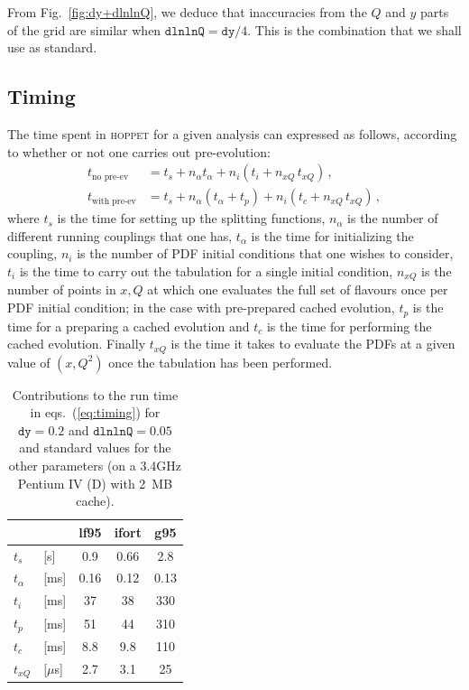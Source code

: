 \documentclass[12pt]{article}
\newcommand{\dy}{\ttt{dy}}
\newcommand{\dlnlnQ}{\ttt{dlnlnQ}}
\newcommand{\hoppet}{\textsc{hoppet}\xspace}
\newcommand{\ttt}[1]{\texttt{#1}}
\begin{document}
From Fig.~\ref{fig:dy+dlnlnQ}, we deduce that inaccuracies from the
$Q$ and $y$ parts of the grid are similar when $\dlnlnQ = \dy /4$.
This is the combination that we shall use as standard.


\subsection{Timing}
\label{sec:Timing}


The time spent in \hoppet for a given analysis can expressed as
follows, according to whether or not one carries out pre-evolution:
\begin{subequations}
  \label{eq:timing}
  \begin{align}
    t_\text{no pre-ev}   &= t_s + n_\alpha t_\alpha + n_i (t_i  + n_{xQ}\, t_{xQ})\,,\\
    t_\text{with pre-ev} &= t_s + n_\alpha (t_\alpha + t_p) + n_i (t_c + n_{xQ}\,
    t_{xQ})\,,
  \end{align}
\end{subequations}
where $t_s$ is the time for setting up the splitting functions,
$n_\alpha$ is the number of different running couplings that one has,
$t_\alpha$ is the time for initializing the coupling,
%
$n_i$ is the number of PDF initial conditions that one wishes to
consider, $t_i$ is the time to carry out the tabulation for a single
initial condition, $n_{xQ}$ is the number of points in $x,Q$ at which
one evaluates the full set of flavours once per PDF initial condition;
in the case with pre-prepared cached evolution, $t_p$ is the time for a
preparing a cached evolution and $t_c$ is the time for performing the
cached evolution. Finally $t_{xQ}$ is the time it takes to evaluate
the PDFs at a given value of $(x,Q^2)$ once the tabulation has
been performed.

\begin{table}
  \centering
  \begin{tabular}{|ll|c|c|c|}\hline
          &&     lf95  &  ifort   & g95    \\\hline
   $t_s$ &[s]  &  0.9  &  0.66    & 2.8    \\
   $t_\alpha$ & [ms]                
               &  0.16 &  0.12    & 0.13   \\
   $t_i$ &[ms] &  37   &   38     & 330    \\
   $t_p$ &[ms] &  51   &   44     & 310    \\
   $t_c$ &[ms] &  8.8  &   9.8    & 110    \\
   $t_{xQ}$ &[$\mu$s]           
               &  2.7  &   3.1    &  25    \\
   \hline
  \end{tabular}
  \caption{Contributions to the run time in eqs.~(\ref{eq:timing})
 for    $\dy=0.2$ and 
    $\dlnlnQ=0.05$ and standard values for the other parameters 
    (on a 3.4GHz Pentium IV (D) with 2~MB cache).}
  \label{tab:timings}
%                    
%                    
\end{table}
\end{document}
